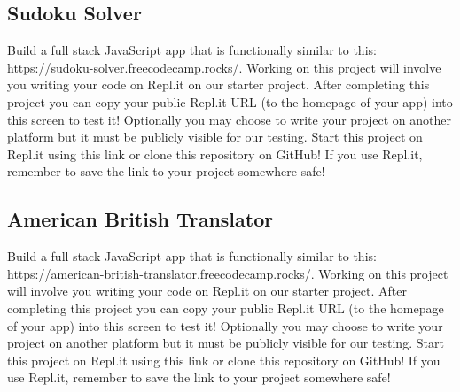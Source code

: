 \documentclass{article}%
\begin{document}
%
\subsection{Sudoku Solver}%
\label{subsec:SudokuSolver}%
Build a full stack JavaScript app that is functionally similar to this: https://sudoku{-}solver.freecodecamp.rocks/.\newline%
Working on this project will involve you writing your code on Repl.it on our starter project. After completing this project you can copy your public Repl.it URL (to the homepage of your app) into this screen to test it! Optionally you may choose to write your project on another platform but it must be publicly visible for our testing.\newline%
Start this project on Repl.it using this link or clone this repository on GitHub! If you use Repl.it, remember to save the link to your project somewhere safe!\newline%

%
\subsection{American British Translator}%
\label{subsec:AmericanBritishTranslator}%
Build a full stack JavaScript app that is functionally similar to this: https://american{-}british{-}translator.freecodecamp.rocks/.\newline%
Working on this project will involve you writing your code on Repl.it on our starter project. After completing this project you can copy your public Repl.it URL (to the homepage of your app) into this screen to test it! Optionally you may choose to write your project on another platform but it must be publicly visible for our testing.\newline%
Start this project on Repl.it using this link or clone this repository on GitHub! If you use Repl.it, remember to save the link to your project somewhere safe!\newline%

%
\newpage%
\end{document}
